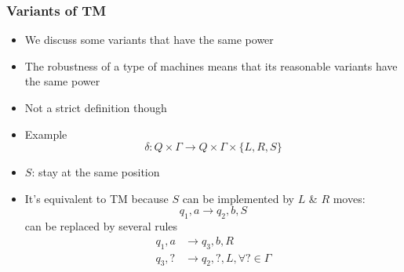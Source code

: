 




\begin{frame}[allowframebreaks] \frametitle{Variants of TM}
  \begin{itemize}
\item We discuss some variants that have the same power

\item
  The robustness of a type of machines means that its reasonable
variants have the same 
power

\item
  [] Not a strict definition though

\item Example
  \begin{equation*}
\delta: Q \times \Gamma\rightarrow Q \times \Gamma 
\times \{L, R, S\}
\end{equation*}
\item
  [] $S$: stay at the same position

\item
  It's equivalent to TM because $S$ can
  be implemented by $L$ \& $R$ moves:
  \begin{equation*}
      q_1,a \rightarrow q_2,b, S
    \end{equation*}
    can be replaced by several rules
    \begin{align*}
q_1,a &\rightarrow q_3, b,R \\
q_3, ? &\rightarrow q_2, ?, L, \forall ? \in \Gamma 
\end{align*}
\end{itemize}
\end{frame}


